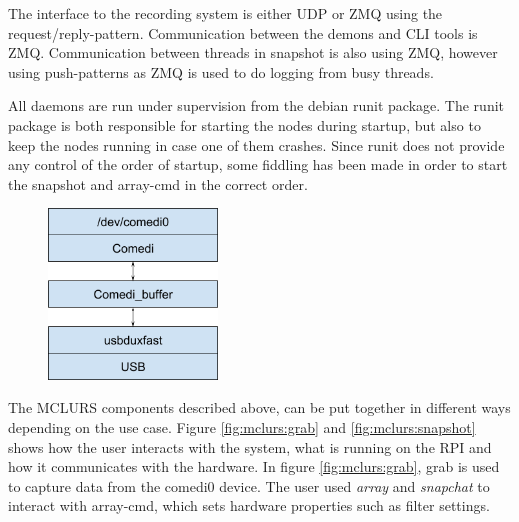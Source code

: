 
The interface to the recording system is either UDP or ZMQ using the request/reply-pattern. Communication between the demons and CLI tools is ZMQ. Communication between threads in snapshot is also using ZMQ, however using push-patterns as ZMQ is used to do logging from busy threads.

All daemons are run under supervision from the debian runit package. The runit package is both responsible for starting the nodes during startup, but also to keep the nodes running in case one of them crashes. Since runit does not provide any control of the order of startup, some fiddling has been made in order to start the snapshot and array-cmd in the correct order.  


 \label{sec:existingsystem:software:kernelmodule}

\begin{figure}[h!]
	\centering
	\includegraphics[width=0.4\textwidth]{figures/mclurs_comedi}
\end{figure}

 \label{sc:existingsystem:setup}
The MCLURS components described above, can be put together in different ways depending on the use case. Figure \ref{fig:mclurs:grab} and \ref{fig:mclurs:snapshot} shows how the user interacts with the system, what is running on the \ac{RPI} and how it communicates with the hardware. In figure \ref{fig:mclurs:grab}, grab is used to capture data from the comedi0 device. The user used \textit{array} and \textit{snapchat} to interact with array-cmd, which sets hardware properties such as filter settings.

